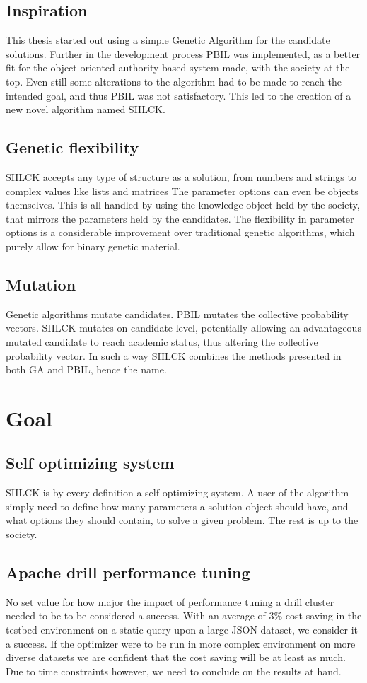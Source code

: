 \documentclass[a4paper,english]{report}
\begin{document}
		\subsection{Inspiration}
		This thesis started out using a simple Genetic Algorithm for the candidate solutions. Further in the development process PBIL was implemented, as a better fit for the object oriented authority based system made, with the society at the top. Even still some alterations to the algorithm had to be made to reach the intended goal, and thus PBIL was not satisfactory. This led to the creation of a new novel algorithm named SIILCK.
		\subsection{Genetic flexibility}
		SIILCK accepts any type of structure as a solution, from numbers and strings to complex values like lists and matrices The parameter options can even be objects themselves. This is all handled by using the knowledge object held by the society, that mirrors the parameters held by the candidates. The flexibility in parameter options is a considerable improvement over traditional genetic algorithms, which purely allow for binary genetic material.
		\subsection{Mutation}
		Genetic algorithms mutate candidates. PBIL mutates the collective probability vectors. SIILCK mutates on candidate level, potentially allowing an advantageous mutated candidate to reach academic status, thus altering the collective probability vector. In such a way SIILCK combines the methods presented in both GA and PBIL, hence the name.
		\clearpage
		\section{Goal}
		\subsection{Self optimizing system}
		SIILCK is by every definition a self optimizing system. A user of the algorithm simply need to define how many parameters a solution object should have, and what options they should contain, to solve a given problem. The rest is up to the society.
		\subsection{Apache drill performance tuning}
		No set value for how major the impact of performance tuning a drill cluster needed to be to be considered a success. With an average of 3\% cost saving in the testbed environment on a static query upon a large JSON dataset, we consider it a success. If the optimizer were to be run in more complex environment on more diverse datasets we are confident that the cost saving will be at least as much. Due to time constraints however, we need to conclude on the results at hand.
\end{document}
